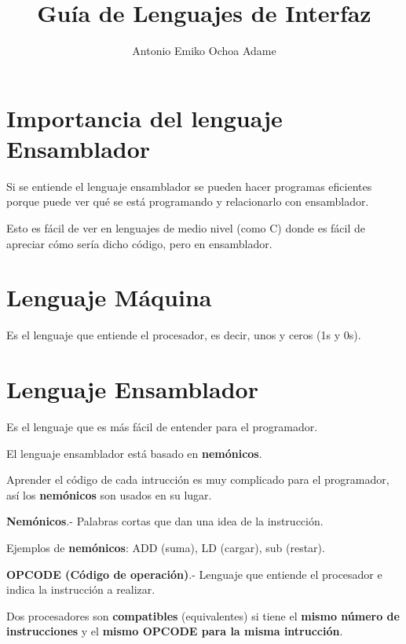 \documentclass{article}
\begin{document}
\title{Guía de Lenguajes de Interfaz}
\author{Antonio Emiko Ochoa Adame}
\maketitle

\section{Importancia del lenguaje Ensamblador}

Si se entiende el lenguaje ensamblador se pueden hacer programas eficientes porque
puede ver qué se está programando y relacionarlo con ensamblador.

\vspace{1em}
Esto es fácil de ver en lenguajes de medio nivel (como C) donde es fácil de
apreciar cómo sería dicho código, pero en ensamblador.

\section{Lenguaje Máquina}

Es el lenguaje que entiende el procesador, es decir, unos y ceros (1s y 0s).

\section{Lenguaje Ensamblador}

Es el lenguaje que es más fácil de entender para el programador.

El lenguaje ensamblador está basado en \textbf{nemónicos}.

\vspace{1em}
Aprender el código de cada intrucción es muy complicado para el programador, así
los \textbf{nemónicos} son usados en su lugar.

\vspace{1em}
\textbf{Nemónicos}.- Palabras cortas que dan una idea de la instrucción.

\vspace{1em}
Ejemplos de \textbf{nemónicos}: ADD (suma), LD (cargar), sub (restar).

\vspace{1em}
\textbf{OPCODE (Código de operación)}.- Lenguaje que entiende el procesador e
indica la instrucción a realizar.

\vspace{1em}
Dos procesadores son \textbf{compatibles} (equivalentes) si tiene el
\textbf{mismo número de instrucciones} y el \textbf{mismo OPCODE para la misma
intrucción}.
\end{document}
